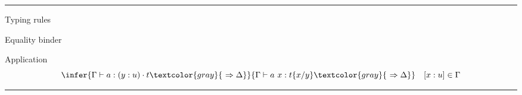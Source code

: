 \documentclass[ignorenonframetext,red]{beamer}
\begin{document}
\hrule
\begin{frame}{Typing rules}
  \begin{block}{Equality binder}
  \end{block}
  \pause
  \begin{block}{Application}
    \[ \infer
      {\Gamma\vdash a : (y:u)\cdot t \textcolor{gray}{\ \Rightarrow\Delta}}
      {\Gamma\vdash a\ x : t \{x/y\} \textcolor{gray}{\ \Rightarrow\Delta}}
      \quad [x : u] \in \Gamma
      \]
  \end{block}
\end{frame}
\hrule
\end{document}
